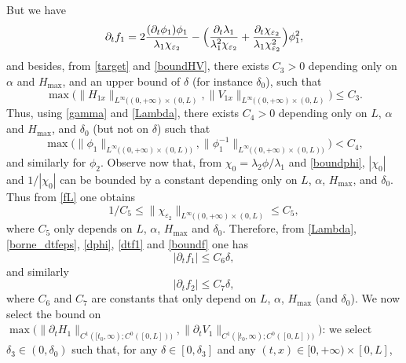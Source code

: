 \documentclass[11pt]{article}
\numberwithin{equation}{section}
\theoremstyle{definition}
\begin{document}
But we have
\begin{equation}
\label{dtf1}
\partial_{t}f_{1}=2\frac{(\partial_{t}\phi_{1})\phi_{1}}{\lambda_{1}\chi_{\varepsilon_{2}}}-\Bigl(\frac{\partial_{t}\lambda_{1}}{\lambda_{1}^{2}\chi_{\varepsilon_{2}}}+\frac{\partial_{t}\chi_{\varepsilon_{2}}}{\lambda_{1}\chi^{2}_{\varepsilon_{2}}} \Bigr)\phi_{1}^2,
\end{equation}
and besides, from \eqref{target} and \eqref{boundHV}, there exists $C_{3}>0$ depending only on $\alpha$ and $H_{\max}$, and an upper bound of $\delta$ (for instance ${\delta_{0}}$), such that
\begin{equation*}
\max\bigl(\lVert H_{1x}\rVert_{L^{\infty}((0,+\infty)\times(0,L)},\lVert V_{1x}\rVert_{L^{\infty}((0,+\infty)\times(0,L)}\bigr)\leq C_{3}.
\end{equation*}
Thus, using \eqref{gamma} and \eqref{Lambda}, there exists $C_{4}>0$ depending only on {$L$,} $\alpha$ and $H_{\max}$, and $\delta_{0}$ (but not on $\delta$) such that
\begin{equation}
\max \bigl(\lVert\phi_{1}\rVert_{L^{\infty}((0,+\infty)\times(0,L){)}},\lVert\phi^{-1}_{{1}}\rVert_{L^{\infty}((0,+\infty)\times(0,L){)}} \bigr)<C_{4},
\label{boundphi}
\end{equation}
and similarly for $\phi_{2}$.
Observe now that, from $\chi_{0}=\lambda_{2}\phi/\lambda_{1}$ and \eqref{boundphi}, $|\chi_{0}|$ and $1/|\chi_{0}|$ can be bounded by a constant depending only on {$L$,} $\alpha$, $H_{\max}$, and
$\delta_{0}$. Thus from
\eqref{fL} one obtains
\begin{equation}
1/C_{5}\leq \lVert \chi_{\varepsilon_{2}}\rVert_{L^{\infty}((0,+\infty)\times(0,L)}\leq C_{5},
\label{boundf}
\end{equation}
where $C_{5}$ only depends on {$L$,} $\alpha$, $H_{\max}$ and $\delta_{0}$.
{Therefore}, from
\eqref{Lambda}, \eqref{borne_dtfeps}, \eqref{dphi}, {\eqref{dtf1}} and \eqref{boundf} one has
\begin{equation*}
|\partial_{t}f_{1}|\leq C_{6}\delta,
\end{equation*}
and similarly
\begin{equation*}
|\partial_{t}f_{2}|\leq C_{7}\delta,
\end{equation*}
where $C_{6}$ and $C_{7}$ are constants that only depend on {$L$,} $\alpha$, $H_{\max}$ (and $\delta_{0}$).
We now select the bound on
$\max \bigl({\lVert\partial_{t}H_{1}\rVert_{C^{1}([t_{0},\infty);{C^{0}([0,L])})},\lVert\partial_{t}V_{1}\rVert_{C^{1}([t_{0},\infty);{C^{0}([0,L])})}} \bigr)$:
we select $\delta_{3}\in(0,\delta_{0})$ such that, for any $\delta\in[0,\delta_{3}]$ and any $(t,x)\in[0,{+}\infty)\times[0,L]$,
\end{document}
